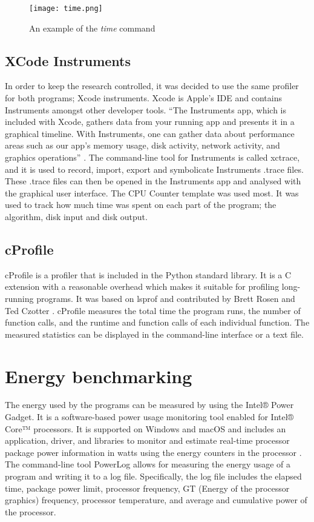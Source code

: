\begin{figure}[htbp]
	\centering
	\texttt{[image: time.png]}
	\caption{An example of the \textit{time} command}
	\label{figure:time}
\end{figure}

\subsection{XCode Instruments}
In order to keep the research controlled, it was decided to use the same profiler for both programs; Xcode instruments. Xcode is Apple’s IDE and contains Instruments amongst other developer tools. “The Instruments app, which is included with Xcode, gathers data from your running app and presents it in a graphical timeline. With Instruments, one can gather data about performance areas such as our app’s memory usage, disk activity, network activity, and graphics operations” \cite{instruments}. The command-line tool for Instruments is called xctrace, and it is used to record, import, export and symbolicate Instruments .trace files. These .trace files can then be opened in the Instruments app and analysed with the graphical user interface. The CPU Counter template was used most. It was used to track how much time was spent on each part of the program; the algorithm, disk input and disk output.

\subsection{cProfile}
cProfile is a profiler that is included in the Python standard library. It is a C extension with a reasonable overhead which makes it suitable for profiling long-running programs. It was based on lsprof and contributed by Brett Rosen and Ted Czotter \cite{cprofile}. cProfile measures the total time the program runs, the number of function calls, and the runtime and function calls of each individual function. The measured statistics can be displayed in the command-line interface or a text file.

\section{Energy benchmarking}
The energy used by the programs can be measured by using the Intel® Power Gadget. It is a software-based power usage monitoring tool enabled for Intel® Core™ processors. It is supported on Windows and macOS and includes an application, driver, and libraries to monitor and estimate real-time processor package power information in watts using the energy counters in the processor \cite{powergadget}. The command-line tool PowerLog allows for measuring the energy usage of a program and writing it to a log file. Specifically, the log file includes the elapsed time, package power limit, processor frequency, GT (Energy of the processor graphics) frequency, processor temperature, and average and cumulative power of the processor.

